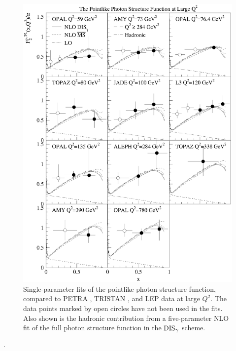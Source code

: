 \documentclass[aps,prl,twocolumn,groupedaddress]{revtex4}
\begin{document}
%
\begin{figure}
 \centering
 \includegraphics[width=0.9\columnwidth]{fig1}
 \caption{\label{fig:1}Single-parameter fits of the pointlike photon structure
 function, compared to PETRA \cite{Bartel:1984cg}, TRISTAN \cite{Sahu:1995gj,
 Muramatsu:1994rq}, and LEP \cite{Barate:1999qy,Acciarri:1998ig,
 Ackerstaff:1997ni,Ackerstaff:1997se,Abbiendi:2002te} data at large
 $Q^2$. The data points marked by open circles have not been used in
 the fits. Also shown is the hadronic contribution from a five-parameter NLO
 fit of the full photon structure function in the ${\rm DIS}_\gamma$ scheme.}
\end{figure}
%
.
\end{document}
